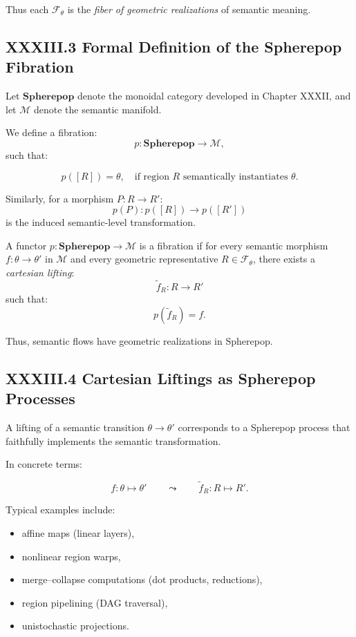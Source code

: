 \documentclass[11pt,letterpaper]{article}
\begin{document}
Thus each $\mathcal{F}_\theta$ is the \emph{fiber of geometric realizations} of semantic meaning.

\subsection{XXXIII.3 Formal Definition of the Spherepop Fibration}

Let $\mathbf{Spherepop}$ denote the monoidal category developed in Chapter XXXII, and let $\mathcal{M}$ denote the semantic manifold.

We define a fibration:
\[
p : \mathbf{Spherepop} \to \mathcal{M},
\]
such that:

\[
p([R]) = \theta, \quad \text{if region } R \text{ semantically instantiates } \theta.
\]

Similarly, for a morphism $P : R \to R'$:
\[
p(P) : p([R]) \to p([R'])
\]
is the induced semantic-level transformation.

\begin{definition}
A functor $p : \mathbf{Spherepop} \to \mathcal{M}$ is a fibration if for every semantic morphism $f : \theta \to \theta'$ in $\mathcal{M}$ and every geometric representative $R \in \mathcal{F}_\theta$, there exists a \emph{cartesian lifting}:
\[
\widetilde{f}_R : R \to R'
\]
such that:
\[
p(\widetilde{f}_R) = f.
\]
\end{definition}

Thus, semantic flows have geometric realizations in Spherepop.

\subsection{XXXIII.4 Cartesian Liftings as Spherepop Processes}

A lifting of a semantic transition $\theta \to \theta'$ corresponds to a Spherepop process that faithfully implements the semantic transformation.

In concrete terms:

\[
f : \theta \mapsto \theta' \qquad\leadsto\qquad
\widetilde{f}_R : R \mapsto R'.
\]

Typical examples include:

\begin{itemize}
    \item affine maps (linear layers),
    \item nonlinear region warps,
    \item merge--collapse computations (dot products, reductions),
    \item region pipelining (DAG traversal),
    \item unistochastic projections.
\end{itemize}
\end{document}
